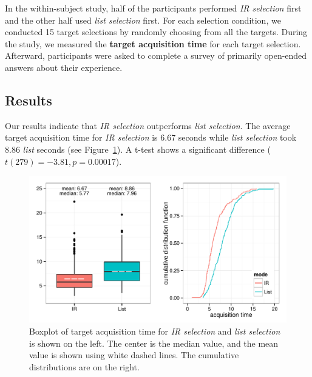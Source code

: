In the within-subject study, half of the participants performed {\em IR selection} first and the other half used {\em list selection} first. For each selection condition, we conducted 15 target selections by randomly choosing from all the targets. During the study, we measured the {\bf target acquisition time} for each target selection. Afterward, participants were asked to complete a survey of primarily open-ended answers about their experience.



\subsection{Results}


Our results indicate that {\em IR selection} outperforms {\em list selection}.  The average target acquisition time for {\em IR selection} is 6.67 seconds 
while {\em list selection} took 8.86 {\em list} seconds (see Figure~\ref{fig:ir_vs_list}). A t-test shows a significant difference ($t(279)=-3.81, p=0.00017$).


\begin{figure}[t]
\centering
\includegraphics[width=1.0\columnwidth]{figures/result_study1a.pdf}
\caption{Boxplot of target acquisition time for {\em IR selection} and {\em list selection} is shown on the left. The center is the median value, and the mean value is shown using white dashed lines. The cumulative distributions are on the right.}
\label{fig:ir_vs_list}
\end{figure}

